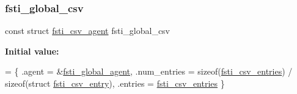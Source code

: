 \subsubsection{\texorpdfstring{fsti\+\_\+global\+\_\+csv}{fsti\_global\_csv}}
{\footnotesize\ttfamily const struct \mbox{\hyperlink{structfsti__csv__agent}{fsti\+\_\+csv\+\_\+agent}} fsti\+\_\+global\+\_\+csv}

{\bfseries Initial value\+:}
\begin{DoxyCode}
=
\{
    .agent = &\mbox{\hyperlink{fsti-events_8c_a0c5214ba8681a0691658466b19dde4d5}{fsti\_global\_agent}},
    .num\_entries = \textcolor{keyword}{sizeof}(\mbox{\hyperlink{fsti-events_8c_a7101c8980d633b64a8060f6f91c48dcd}{fsti\_csv\_entries}}) / \textcolor{keyword}{sizeof}(\textcolor{keyword}{struct} 
      \mbox{\hyperlink{structfsti__csv__entry}{fsti\_csv\_entry}}),
    .entries = \mbox{\hyperlink{fsti-events_8c_a7101c8980d633b64a8060f6f91c48dcd}{fsti\_csv\_entries}}
\}
\end{DoxyCode}
